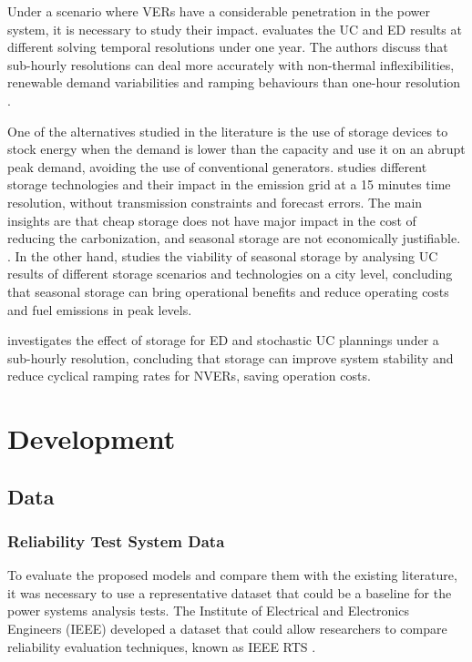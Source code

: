 \documentclass[12pt,LUDisStyle,twosided]{book}
\begin{document}
Under a scenario where VERs have a considerable penetration in the power system, it is necessary to study their impact. \citeauthor{deane} evaluates the UC and ED results at different solving temporal resolutions under one year. The authors discuss that sub-hourly resolutions can deal more accurately with non-thermal inflexibilities, renewable demand variabilities and ramping behaviours than one-hour resolution \cite{deane}. 

One of the alternatives studied in the literature is the use of storage devices to stock energy when the demand is lower than the capacity and use it on an abrupt peak demand, avoiding the use of conventional generators.\citeauthor{safaei} studies different storage technologies and their impact in the emission grid at a 15 minutes time resolution, without transmission constraints and forecast errors. The main insights are that cheap storage does not have major impact in the cost of reducing the carbonization, and seasonal storage are not economically justifiable. \cite{safaei}. In the other hand, \citeauthor{harris} studies the viability of seasonal storage by analysing UC results of different storage scenarios and technologies on a city level, concluding that seasonal storage can bring operational benefits and reduce operating costs and fuel emissions in peak levels.
 
\citeauthor{dwyer} investigates the effect of storage for ED and stochastic UC plannings under a sub-hourly resolution, concluding that storage can improve system stability and reduce cyclical ramping rates for NVERs, saving operation costs. 

\chapter{Development}
\section{Data}

\subsection{Reliability Test System Data}

To evaluate the proposed models and compare them with the existing literature, it was necessary to use a representative dataset that could be a baseline for the power systems analysis tests. The Institute of Electrical and Electronics Engineers (IEEE) developed a dataset that could allow researchers to compare reliability evaluation techniques, known as IEEE RTS \cite{wongieee}. 
\end{document}
